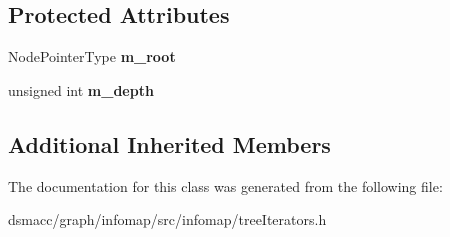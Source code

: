 \subsection*{Protected Attributes}
\begin{DoxyCompactItemize}
\item 
\mbox{\label{classDepthFirstIteratorBase_a80b496907358b9a4440cc6878a2ef864}} 
Node\+Pointer\+Type {\bfseries m\+\_\+root}
\item 
\mbox{\label{classDepthFirstIteratorBase_a8c456231d14d5951404d48ddf0e79adb}} 
unsigned int {\bfseries m\+\_\+depth}
\end{DoxyCompactItemize}
\subsection*{Additional Inherited Members}


The documentation for this class was generated from the following file\+:\begin{DoxyCompactItemize}
\item 
dsmacc/graph/infomap/src/infomap/tree\+Iterators.\+h\end{DoxyCompactItemize}
